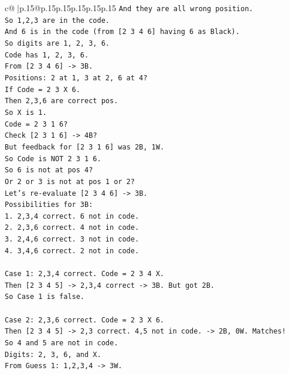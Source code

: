 \documentclass{article}
\begin{document}
{\begin{supertabular}{c@{$\;$}|p{.15\linewidth}@{}p{.15\linewidth}p{.15\linewidth}p{.15\linewidth}p{.15\linewidth}p{.15\linewidth}}
{{{\texttt{And they are all wrong position.} \\
\texttt{So 1,2,3 are in the code.} \\
\texttt{And 6 is in the code (from {[}2 3 4 6{]} having 6 as Black).} \\
\texttt{So digits are 1, 2, 3, 6.} \\
\texttt{Code has 1, 2, 3, 6.} \\
\texttt{From {[}2 3 4 6{]} {-}> 3B.} \\
\texttt{Positions: 2 at 1, 3 at 2, 6 at 4?} \\
\texttt{If Code = 2 3 X 6.} \\
\texttt{Then 2,3,6 are correct pos.} \\
\texttt{So X is 1.} \\
\texttt{Code = 2 3 1 6?} \\
\texttt{Check {[}2 3 1 6{]} {-}> 4B?} \\
\texttt{But feedback for {[}2 3 1 6{]} was 2B, 1W.} \\
\texttt{So Code is NOT 2 3 1 6.} \\
\texttt{So 6 is not at pos 4?} \\
\texttt{Or 2 or 3 is not at pos 1 or 2?} \\
\texttt{Let's re{-}evaluate {[}2 3 4 6{]} {-}> 3B.} \\
\texttt{Possibilities for 3B:} \\
\texttt{1. 2,3,4 correct. 6 not in code.} \\
\texttt{2. 2,3,6 correct. 4 not in code.} \\
\texttt{3. 2,4,6 correct. 3 not in code.} \\
\texttt{4. 3,4,6 correct. 2 not in code.} \\
\\ 
\texttt{Case 1: 2,3,4 correct. Code = 2 3 4 X.} \\
\texttt{Then {[}2 3 4 5{]} {-}> 2,3,4 correct {-}> 3B. But got 2B.} \\
\texttt{So Case 1 is false.} \\
\\ 
\texttt{Case 2: 2,3,6 correct. Code = 2 3 X 6.} \\
\texttt{Then {[}2 3 4 5{]} {-}> 2,3 correct. 4,5 not in code. {-}> 2B, 0W. Matches!} \\
\texttt{So 4 and 5 are not in code.} \\
\texttt{Digits: 2, 3, 6, and X.} \\
\texttt{From Guess 1: 1,2,3,4 {-}> 3W.} \\
}}}
\end{supertabular}}
\end{document}
